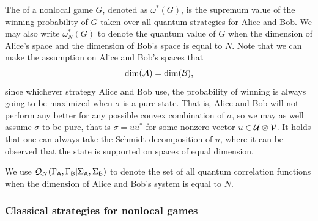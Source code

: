 The  of a nonlocal game $G$, denoted as $\omega^*(G)$, is the supremum value of the winning probability of $G$ taken over all quantum strategies for Alice and Bob. We may also write $\omega_N^*(G)$ to denote the quantum value of $G$ when the dimension of Alice's space and the dimension of Bob's space is equal to $N$. Note that we can make the assumption on Alice and Bob's spaces that
\begin{align}
	\dim(\mathcal{A}) = \dim(\mathcal{B}),
\end{align} 
since whichever strategy Alice and Bob use, the probability of winning is always going to be maximized when $\sigma$ is a pure state. That is, Alice and Bob will not perform any better for any possible convex combination of $\sigma$, so we may as well assume $\sigma$ to be pure, that is $\sigma = uu^*$ for some nonzero vector $u \in \mathcal{U} \otimes \mathcal{V}$. It holds that one can always take the Schmidt decomposition of $u$, where it can be observed that the state is supported on spaces of equal dimension. 

We use $\mathcal{Q}_N(\Gamma_{\mathsf{A}}, \Gamma_{\mathsf{B}} | \Sigma_{\mathsf{A}}, \Sigma_{\mathsf{B}})$ to denote the set of all quantum correlation functions when the dimension of Alice and Bob's system is equal to $N$. 


\subsubsection*{Classical strategies for nonlocal games}
\label{sec:classical-strategies-for-nonlocal-games}

